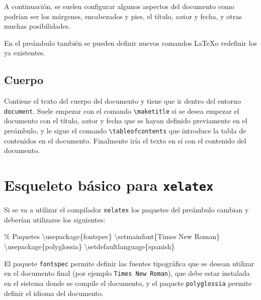 \documentclass[
  letterpaper,
  DIV=11,
  numbers=noendperiod]{scrreport}
\newenvironment{Shaded}{\begin{snugshade}}{\end{snugshade}}
\newcommand{\BuiltInTok}[1]{\textcolor[rgb]{0.00,0.23,0.31}{#1}}
\newcommand{\CommentTok}[1]{\textcolor[rgb]{0.37,0.37,0.37}{#1}}
\newcommand{\ExtensionTok}[1]{\textcolor[rgb]{0.00,0.23,0.31}{#1}}
\newcommand{\FunctionTok}[1]{\textcolor[rgb]{0.28,0.35,0.67}{#1}}
\newcommand{\NormalTok}[1]{\textcolor[rgb]{0.00,0.23,0.31}{#1}}
\begin{document}
A continuación, se suelen configurar algunos aspectos del documento como
podrían ser los márgenes, encabezados y pies, el título, autor y fecha,
y otras muchas posibilidades.

En el preámbulo también se pueden definir nuevos comandos \LaTeX o
redefinir los ya existentes.

\hypertarget{cuerpo}{%
\subsection{Cuerpo}\label{cuerpo}}

Contiene el texto del cuerpo del documento y tiene que ir dentro del
entorno \texttt{document}. Suele empezar con el comando
\texttt{\textbackslash{}maketitle} si se desea empezar el documento con
el título, autor y fecha que se hayan definido previamente en el
preámbulo, y le sigue el comando
\texttt{\textbackslash{}tableofcontents} que introduce la tabla de
contenidos en el documento. Finalmente iría el texto en sí con el
contenido del documento.

\hypertarget{esqueleto-buxe1sico-para-xelatex}{%
\section{\texorpdfstring{Esqueleto básico para
\texttt{xelatex}}{Esqueleto básico para xelatex}}\label{esqueleto-buxe1sico-para-xelatex}}

Si se va a utilizar el compilador \texttt{xelatex} los paquetes del
preámbulo cambian y deberían utilizarse los siguientes:

\begin{Shaded}
\begin{Highlighting}[]
\CommentTok{\% Paquetes}
\BuiltInTok{\textbackslash{}usepackage}\NormalTok{\{}\ExtensionTok{fontspec}\NormalTok{\}}
\FunctionTok{\textbackslash{}setmainfont}\NormalTok{\{Times New Roman\}}
\BuiltInTok{\textbackslash{}usepackage}\NormalTok{\{}\ExtensionTok{polyglossia}\NormalTok{\}}
\FunctionTok{\textbackslash{}setdefaultlanguage}\NormalTok{\{spanish\}}
\end{Highlighting}
\end{Shaded}

El paquete \texttt{fontspec} permite definir las fuentes tipográfica que
se desean utilizar en el documento final (por ejemplo
\texttt{Times\ New\ Roman}), que debe estar instalada en el sistema
donde se compile el documento, y el paquete \texttt{polyglossia} permite
definir el idioma del documento.
\end{document}
